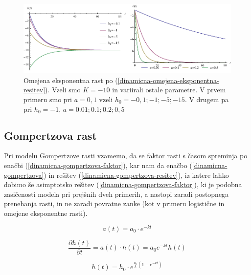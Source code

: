 \documentclass[a4paper, oneside, 12pt]{book}
\begin{document}
            \begin{figure}[H]
              \begin{center}
                \includegraphics[width=14cm]{slike/omejena-eksponentna-rast}
              \end{center}
              \caption{Omejena eksponentna rast po (\ref{dinamicna-omejena-eksponentna-resitev}). Vzeli smo $K=-10$ in variirali ostale parametre. V prvem primeru smo pri $a=0,1$ vzeli $h_0=-0,1;-1;-5;-15$. V drugem pa pri $h_0=-1$, $a=0.01;0.1;0.2;0,5$}
              \label{fig:omejena-eksponentna-rast}
            \end{figure}



          \subsection{Gompertzova rast}

          Pri modelu Gompertzove rasti vzamemo, da se faktor rasti s časom spreminja po enačbi (\ref{dinamicna-gompertzova-faktor}), kar nam da enačbo (\ref{dinamicna-gompertzova}) in rešitev (\ref{dinamicna-gompertzova-resitev}), iz katere lahko dobimo še asimptotsko rešitev (\ref{dinamicna-gompertzova-faktor}), ki je podobna zasičenosti modela pri prejšnih dveh primerih, a nastopi zaradi postopnega prenehanja rasti, in ne zaradi povratne zanke (kot v primeru logistične in omejene eksponentne rasti).

          \begin{equation}
            a(t) = a_0 \cdot e^{- k t}
            \label{dinamicna-gompertzova-faktor}
          \end{equation}

          \begin{equation}
            \frac{\partial h(t)}{\partial t} = a(t) \cdot h(t) = a_0 e^{ -k t} h(t)
            \label{dinamicna-gompertzova}
          \end{equation}

          \begin{equation}
            h(t) = h_0 \cdot e^{\frac{a_0}{k}(1-e^{-kt})}
           \label{dinamicna-gompertzova-resitev}
          \end{equation}
\end{document}
